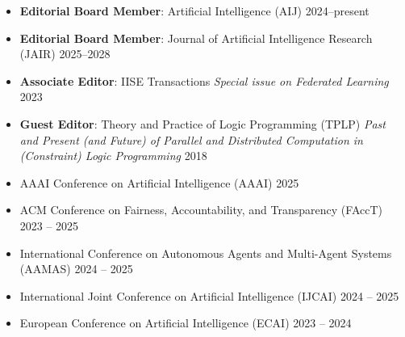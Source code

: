   \begin{itemize}
    \item {\bf Editorial Board Member}: Artificial Intelligence (AIJ)
    \hfill{2024--present}

    \item {\bf Editorial Board Member}: Journal of Artificial Intelligence Research (JAIR)
    \hfill{2025--2028}

    \item {\bf Associate Editor}: IISE Transactions
    \emph{Special issue on Federated Learning} \hfill{2023}

  \item {\bf Guest Editor}: {Theory and Practice of Logic Programming (TPLP)}
  \emph{Past and Present (and Future) of Parallel and Distributed Computation in (Constraint) Logic Programming} 
  \hfill {2018}
\end{itemize}




\begin{itemize}
  \item AAAI Conference on Artificial Intelligence (AAAI) \hfill {2025}  
  \item ACM Conference on Fairness, Accountability, and Transparency (FAccT) \hfill {2023 -- 2025}
  \item International Conference on Autonomous Agents and Multi-Agent Systems (AAMAS) \hfill {2024 -- 2025}
  \item International Joint Conference on Artificial Intelligence (IJCAI) \hfill {2024 -- 2025}
  \item European Conference on Artificial Intelligence (ECAI) \hfill {2023 -- 2024}
\end{itemize}

